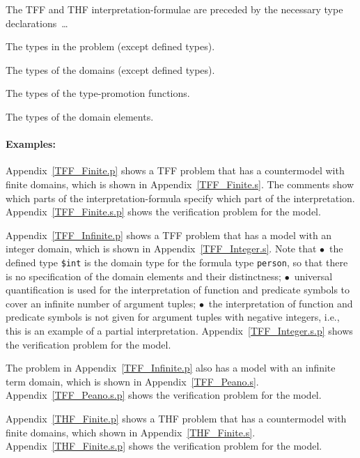 \documentclass{easychair}
\newcommand{\smalltt}[1]{\small \texttt{#1}}
\newenvironment{packed_itemize}{
\vspace*{-0.3em}
\begin{itemize}
\setlength{\partopsep}{0pt}
\setlength{\itemsep}{1pt}
\setlength{\parskip}{0pt}
\setlength{\parsep}{0pt}
}{\end{itemize}}
\begin{document}
\vspace*{0.5em}
The TFF and THF interpretation-formulae are preceded by the necessary type declarations~\ldots
\begin{packed_itemize}
\item The types in the problem (except defined types).
\item The types of the domains (except defined types).
\item The types of the type-promotion functions.
\item The types of the domain elements.
\end{packed_itemize}

\paragraph{Examples:}
\begin{packed_itemize}
\item Appendix~\ref{TFF_Finite.p} shows a TFF problem that has a countermodel with finite domains,
      which is shown in Appendix~\ref{TFF_Finite.s}.
      The comments show which parts of the interpretation-formula specify which part of the 
      interpretation.
      Appendix~\ref{TFF_Finite.s.p} shows the verification problem for the model.
\item Appendix~\ref{TFF_Infinite.p} shows a TFF problem that has a model with an integer domain,
      which is shown in Appendix~\ref{TFF_Integer.s}.
      Note that $\bullet$~the defined type {\smalltt{\$int}} is the domain type for the formula 
      type {\smalltt{person}}, so that there is no specification of the domain elements and their 
      distinctness; $\bullet$~universal quantification is used for the interpretation of function 
      and predicate symbols to cover an infinite number of argument tuples; $\bullet$~the 
      interpretation of function and predicate symbols is not given for argument tuples with 
      negative integers, i.e., this is an example of a partial interpretation.
      Appendix~\ref{TFF_Integer.s.p} shows the verification problem for the model.
\item The problem in Appendix~\ref{TFF_Infinite.p} also has a model with an infinite term domain,
      which is shown in Appendix~\ref{TFF_Peano.s}.
      Appendix~\ref{TFF_Peano.s.p} shows the verification problem for the model.
\item Appendix~\ref{THF_Finite.p} shows a THF problem that has a countermodel with finite domains,
      which shown in Appendix~\ref{THF_Finite.s}.
      Appendix~\ref{THF_Finite.s.p} shows the verification problem for the model.
\end{packed_itemize}
\end{document}
